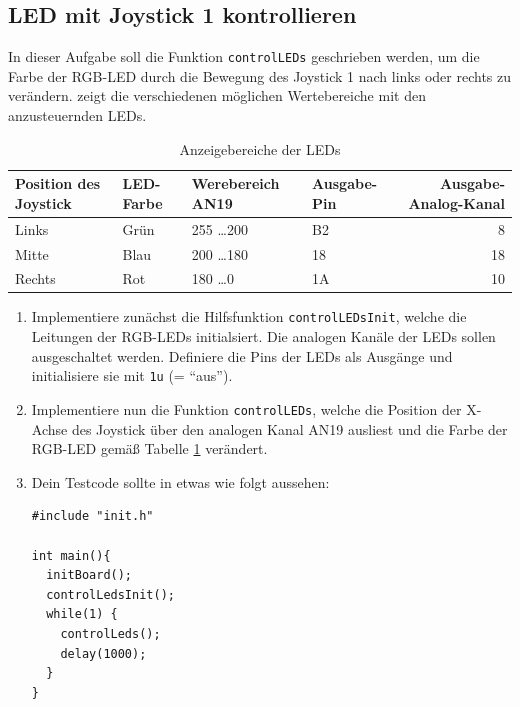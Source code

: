 \subsection{LED mit Joystick 1 kontrollieren}
In dieser Aufgabe soll die Funktion \lstinline|controlLEDs| geschrieben werden, um die Farbe der RGB-LED durch die Bewegung des Joystick 1 nach links oder rechts zu verändern.
 zeigt die verschiedenen möglichen Wertebereiche mit den anzusteuernden LEDs.
%
\begin{table}[]
    \centering
    \caption{Anzeigebereiche der LEDs}
    \label{tab:controlLED}
    \begin{tabular}{llllr}
        \toprule
        \textbf{Position des Joystick} & \textbf{LED-Farbe} & \textbf{Werebereich AN19} & \textbf{Ausgabe-Pin} & \textbf{Ausgabe-Analog-Kanal}\\
        \midrule
        Links & Grün & 255 \dots 200 & B2 & 8\\
        Mitte & Blau & 200 \dots 180 & 18 & 18\\
        Rechts & Rot & 180 \dots 0 & 1A & 10\\
        \bottomrule
    \end{tabular}
\end{table}
%
\begin{enumerate}
\item
Implementiere zunächst die Hilfsfunktion \lstinline|controlLEDsInit|, welche die Leitungen der RGB-LEDs initialsiert. Die analogen Kanäle der LEDs sollen ausgeschaltet werden.
Definiere die Pins der LEDs als Ausgänge und initialisiere sie mit \lstinline|1u| (= \enquote{aus}). 

\item
Implementiere nun die Funktion \lstinline|controlLEDs|, welche die Position der X-Achse des Joystick über den analogen Kanal AN19 ausliest und die Farbe der RGB-LED gemäß Tabelle \ref{tab:controlLED} verändert. 

\item 
Dein Testcode sollte in etwas wie folgt aussehen:

\begin{minipage}{\textwidth}
\begin{lstlisting}[]
#include "init.h"

int main(){
  initBoard();
  controlLedsInit();
  while(1) {
    controlLeds();
    delay(1000);
  }
}
\end{lstlisting}\end{minipage} 
\end{enumerate}
